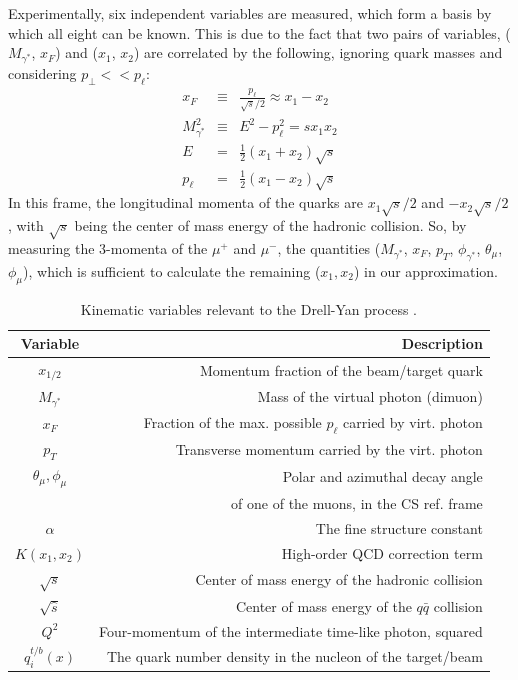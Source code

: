 Experimentally, six independent variables are measured, which form a basis by which all eight can be known. This is due to the fact that two pairs of variables, ($M_{\gamma^*}$, $x_F$) and ($x_1$, $x_2$) are correlated by the following, ignoring quark masses and considering $p_\perp << p_{\ell}$:
\begin{eqnarray}
x_F & \equiv & \frac{p_{\ell}}{\sqrt{s}/2} \approx x_1 - x_2 \label{eq:xf=x1-x2} \\
M_{\gamma^*}^2 & \equiv & E^2 - p_{\ell}^2  = s x_1 x_2 \label{eq:m=sx1x2} \\
E & = & \frac{1}{2}(x_1 + x_2) \sqrt{s} \\
p_{\ell} & = & \frac{1}{2}(x_1 - x_2)\sqrt{s}
\end{eqnarray}
In this frame, the longitudinal momenta of the quarks are $x_1 \sqrt{s}/2$ and $- x_2 \sqrt{s}/2$, with $\sqrt{s}$ being the center of mass energy of the hadronic collision. So, by measuring the 3-momenta of the $\mu^+$ and $\mu^-$, the quantities ($M_{\gamma^*}$, $x_F$, $p_T$, $\phi_{\gamma^*}$, $\theta_\mu$, $\phi_\mu$), which is sufficient to calculate the remaining ($x_1, x_2$) in our approximation.

\begin{table}[h]
	\centering
	\begin{tabular}{c|r}
		Variable&Description\\ \hline \hline
		$x_{1/2}$ & Momentum fraction of the beam/target quark\\
		$M_{\gamma^*}$ & Mass of the virtual photon (dimuon)\\
		$x_F$ & Fraction of the max. possible $p_{\ell}$ carried by virt. photon\\
		$p_T$ & Transverse momentum carried by the virt. photon\\
		$\theta_{\mu}, \phi_{\mu}$ & Polar and azimuthal decay angle\\ & of one of the muons, in the CS ref. frame\\ \hline
		$\alpha$ & The fine structure constant \\
		$K(x_1,x_2)$ & High-order QCD correction term \\
		$\sqrt{s}$ & Center of mass energy of the hadronic collision \\
		$\sqrt{\hat{s}}$ & Center of mass energy of the $q\bar{q}$ collision \\
		$Q^{2}$ & Four-momentum of the intermediate time-like photon, squared \\ 
		$q_i^{t/b}(x)$ & The quark number density in the nucleon of the target/beam \\ \hline \hline
	\end{tabular}
	\caption{Kinematic variables relevant to the Drell-Yan process .}
	\label{tab:var}
\end{table}


